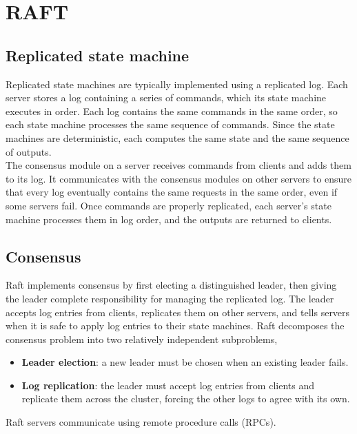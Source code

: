 \documentclass{article}
\begin{document}
\section{RAFT}
\subsection{Replicated state machine}
Replicated state machines are typically implemented
using a replicated log. Each server
stores a log containing a series of commands, which its
state machine executes in order. Each log contains the
same commands in the same order, so each state machine processes the same sequence of commands. Since
the state machines are deterministic, each computes the
same state and the same sequence of outputs. \\
The consensus module on a server
receives commands from clients and adds them to its log.
It communicates with the consensus modules on other
servers to ensure that every log eventually contains the
same requests in the same order, even if some servers fail.
Once commands are properly replicated, each server’s
state machine processes them in log order, and the outputs are returned to clients.
\subsection{Consensus}
Raft implements consensus by first electing a distinguished leader, then giving the leader complete responsibility for managing the replicated log. The leader accepts
log entries from clients, replicates them on other servers,
and tells servers when it is safe to apply log entries to
their state machines.
Raft decomposes the consensus problem into two relatively independent subproblems,
\begin{itemize}
    \item \textbf{Leader election}: a new leader must be chosen when an
existing leader fails.
\item \textbf{Log replication}: the leader must accept log entries
from clients and replicate them across the cluster, forcing the other logs to agree with its own.
\end{itemize}
Raft servers communicate using remote procedure calls
(RPCs).
\end{document}
